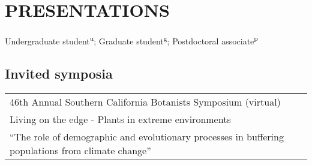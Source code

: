 \documentclass[11pt,english]{article}\usepackage[]{graphicx}\usepackage[]{color}
\providecommand{\tabularnewline}{\\}
\begin{document}
\vspace{0.5ex}


\section*{PRESENTATIONS}
Undergraduate student\textsuperscript{u}; Graduate student\textsuperscript{g}; Postdoctoral associate\textsuperscript{p} 
\vspace{-0.5ex}
\subsection*{Invited symposia}

\begin{tabularx}{\textwidth}{@{}>{\raggedright}p{5.25in}
>{\raggedleft}X@{}}

46th Annual Southern California Botanists Symposium (virtual) & 2020 \tabularnewline
\addtolength{\leftskip}{5ex} Living on the edge - Plants in extreme environments \tabularnewline
\addtolength{\leftskip}{5ex} ``The role of demographic and evolutionary processes in buffering populations from climate change''
\tabularnewline

\end{tabularx}
\end{document}
